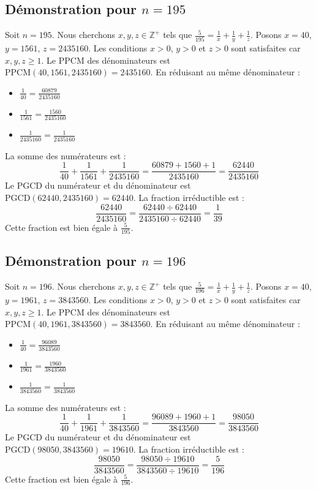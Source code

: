 \documentclass[11pt,a4paper]{article}
\begin{document}
\subsection{Démonstration pour $n = 195$}
Soit $n = 195$. Nous cherchons $x, y, z \in \mathbb{Z}^{+}$ tels que $\frac{5}{195} = \frac{1}{x} + \frac{1}{y} + \frac{1}{z}$.
Posons $x = 40$, $y = 1561$, $z = 2435160$.
Les conditions $x > 0$, $y > 0$ et $z > 0$ sont satisfaites car $x, y, z \geq 1$.
Le PPCM des dénominateurs est $\text{PPCM}(40, 1561, 2435160) = 2435160$.
En réduisant au même dénominateur :
\begin{itemize}
    \item $\frac{1}{40} = \frac{60879}{2435160}$
    \item $\frac{1}{1561} = \frac{1560}{2435160}$
    \item $\frac{1}{2435160} = \frac{1}{2435160}$
\end{itemize}
La somme des numérateurs est :
$$ \frac{1}{40} + \frac{1}{1561} + \frac{1}{2435160} = \frac{60879 + 1560 + 1}{2435160} = \frac{62440}{2435160} $$
Le PGCD du numérateur et du dénominateur est $\text{PGCD}(62440, 2435160) = 62440$.
La fraction irréductible est :
$$ \frac{62440}{2435160} = \frac{62440 \div 62440}{2435160 \div 62440} = \frac{1}{39} $$
Cette fraction est bien égale à $\frac{5}{195}$.

\subsection{Démonstration pour $n = 196$}
Soit $n = 196$. Nous cherchons $x, y, z \in \mathbb{Z}^{+}$ tels que $\frac{5}{196} = \frac{1}{x} + \frac{1}{y} + \frac{1}{z}$.
Posons $x = 40$, $y = 1961$, $z = 3843560$.
Les conditions $x > 0$, $y > 0$ et $z > 0$ sont satisfaites car $x, y, z \geq 1$.
Le PPCM des dénominateurs est $\text{PPCM}(40, 1961, 3843560) = 3843560$.
En réduisant au même dénominateur :
\begin{itemize}
    \item $\frac{1}{40} = \frac{96089}{3843560}$
    \item $\frac{1}{1961} = \frac{1960}{3843560}$
    \item $\frac{1}{3843560} = \frac{1}{3843560}$
\end{itemize}
La somme des numérateurs est :
$$ \frac{1}{40} + \frac{1}{1961} + \frac{1}{3843560} = \frac{96089 + 1960 + 1}{3843560} = \frac{98050}{3843560} $$
Le PGCD du numérateur et du dénominateur est $\text{PGCD}(98050, 3843560) = 19610$.
La fraction irréductible est :
$$ \frac{98050}{3843560} = \frac{98050 \div 19610}{3843560 \div 19610} = \frac{5}{196} $$
Cette fraction est bien égale à $\frac{5}{196}$.
\end{document}
